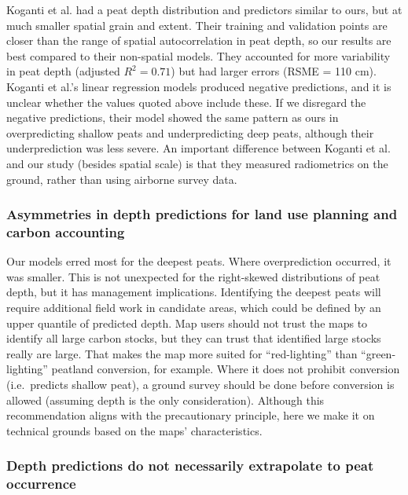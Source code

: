 \documentclass[soil, manuscript]{copernicus}
\begin{document}
Koganti et al. \citeyearpar{kogantiMappingPeatDepth2023} had a peat depth distribution and predictors similar to ours, but at much smaller spatial grain and extent.
Their training and validation points are closer than the range of spatial autocorrelation in peat depth, so our results are best compared to their non-spatial models.
They accounted for more variability in peat depth (adjusted \(R^2 = 0.71\)) but had larger errors (RSME = 110 cm).
Koganti et al.'s \citeyearpar{kogantiMappingPeatDepth2023} linear regression models produced negative predictions, and it is unclear whether the values quoted above include these.
If we disregard the negative predictions, their model showed the same pattern as ours in overpredicting shallow peats and underpredicting deep peats, although their underprediction was less severe.
An important difference between Koganti et al. \citeyearpar{kogantiMappingPeatDepth2023} and our study (besides spatial scale) is that they measured radiometrics on the ground, rather than using airborne survey data.

\subsubsection{Asymmetries in depth predictions for land use planning and carbon accounting}

Our models erred most for the deepest peats.
Where overprediction occurred, it was smaller.
This is not unexpected for the right-skewed distributions of peat depth, but it has management implications.
Identifying the deepest peats will require additional field work in candidate areas, which could be defined by an upper quantile of predicted depth.
Map users should not trust the maps to identify all large carbon stocks, but they can trust that identified large stocks really are large.
That makes the map more suited for ``red-lighting'' than ``green-lighting'' peatland conversion, for example.
Where it does not prohibit conversion (i.e.~predicts shallow peat), a ground survey should be done before conversion is allowed (assuming depth is the only consideration).
Although this recommendation aligns with the precautionary principle, here we make it on technical grounds based on the maps' characteristics.

\subsubsection{Depth predictions do not necessarily extrapolate to peat occurrence}
\end{document}
